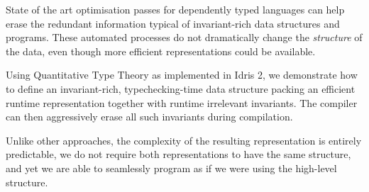State of the art optimisation passes for dependently typed languages can help
erase the redundant information typical of invariant-rich data structures and
programs.
These automated processes do not dramatically change the \emph{structure} of
the data, even though more efficient representations could be available.

Using Quantitative Type Theory as implemented in Idris 2,
we demonstrate how to define an invariant-rich,
typechecking-time data structure packing an efficient runtime representation
together with runtime irrelevant invariants. The compiler can then aggressively
erase all such invariants during compilation.

Unlike other approaches, the complexity of the resulting representation is
entirely predictable, we do not require both representations to have the
same structure, and yet we are able to seamlessly program as if we were
using the high-level structure.
